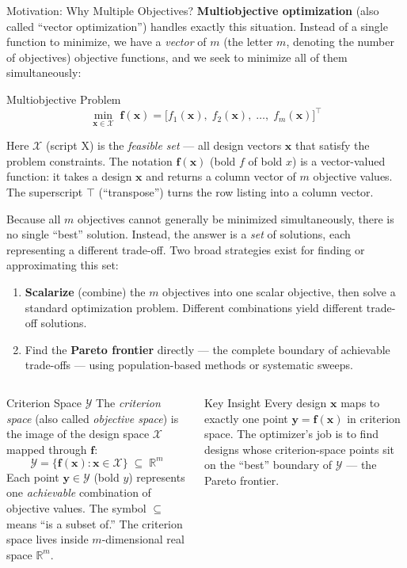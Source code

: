 \documentclass[aspectratio=169,10pt]{beamer}
\newcommand{\bx}{\mathbf{x}}
\newcommand{\by}{\mathbf{y}}
\newcommand{\bff}{\mathbf{f}}
\begin{document}
\begin{frame}[allowframebreaks]{Motivation: Why Multiple Objectives?}
\textbf{Multiobjective optimization} (also called ``vector optimization'')
handles exactly this situation.  Instead of a single function to minimize, we
have a \emph{vector} of $m$ (the letter $m$, denoting the number of objectives)
objective functions, and we seek to minimize all of them simultaneously:

\begin{block}{Multiobjective Problem}
  \[
    \min_{\bx \in \mathcal{X}}\; \bff(\bx)
    = \bigl[f_1(\bx),\; f_2(\bx),\; \ldots,\; f_m(\bx)\bigr]^\top
  \]
\end{block}

Here $\mathcal{X}$ (script X) is the \emph{feasible set} --- all design
vectors $\bx$ that satisfy the problem constraints.  The notation
$\bff(\bx)$ (bold $f$ of bold $x$) is a vector-valued function: it takes
a design $\bx$ and returns a column vector of $m$ objective values.  The
superscript $\top$ (``transpose'') turns the row listing into a column vector.

Because all $m$ objectives cannot generally be minimized simultaneously, there
is no single ``best'' solution.  Instead, the answer is a \emph{set} of
solutions, each representing a different trade-off.  Two broad strategies exist
for finding or approximating this set:

\begin{enumerate}
  \item \textbf{Scalarize} (combine) the $m$ objectives into one scalar
    objective, then solve a standard optimization problem.  Different
    combinations yield different trade-off solutions.

  \item Find the \textbf{Pareto frontier} directly --- the complete boundary
    of achievable trade-offs --- using population-based methods or systematic
    sweeps.
\end{enumerate}

\begin{columns}
\begin{block}{Criterion Space $\mathcal{Y}$}
  The \emph{criterion space} (also called \emph{objective space}) is the image
  of the design space $\mathcal{X}$ mapped through $\bff$:
  \[
    \mathcal{Y} = \bigl\{\bff(\bx) : \bx \in \mathcal{X}\bigr\}
    \;\subseteq\; \mathbb{R}^m
  \]
  Each point $\by \in \mathcal{Y}$ (bold $y$) represents one
  \emph{achievable} combination of objective values.  The symbol
  $\subseteq$ means ``is a subset of.''  The criterion space lives inside
  $m$-dimensional real space $\mathbb{R}^m$.
\end{block}
\begin{alertblock}{Key Insight}
  Every design $\bx$ maps to exactly one point $\by = \bff(\bx)$ in criterion
  space.  The optimizer's job is to find designs whose criterion-space points
  sit on the ``best'' boundary of $\mathcal{Y}$ --- the Pareto frontier.
\end{alertblock}
\end{columns}

\end{frame}
\end{document}
